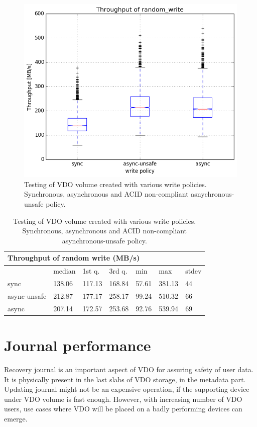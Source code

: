 \documentclass[
  color, %
  table, %
  lof,   %
  lot,   %
]{fithesis3}
\begin{document}
\begin{figure}[!htb]
        \centering
        \includegraphics[width=\textwidth]{../results/write_policies/report/random_write1_compare_boxplots}
\caption[Performance of various write policies]{Testing of VDO volume created with various write policies. Synchronous, asynchronous and ACID non-compliant asnychronous-unsafe policy.}
\label{fig:writepolicies}
\end{figure}

\begin{table}
\begin{tabular}{|l|l|l|l|l|l|l|}
        \hline
        \multicolumn{7}{|l|}{Throughput of random write (MB/s)} \\ \hline
         & median & 1st q. & 3rd q. & min & max & stdev \\ \hline 
sync & 138.06 & 117.13 & 168.84 & 57.61 & 381.13 & 44 \\ \hline
async-unsafe & 212.87 & 177.17 & 258.17 & 99.24 & 510.32 & 66 \\ \hline
async & 207.14 & 172.57 & 253.68 & 92.76 & 539.94 & 69 \\ \hline
\end{tabular}
\caption[Performance of various write policies]{Testing of VDO volume created with various write policies. Synchronous, asynchronous and ACID non-compliant asynchronous-unsafe policy.}
\label{tab:writepolicies}
\end{table}

\section{Journal performance}
Recovery journal is an important aspect of VDO for assuring safety of user data. It is physically present in the last slabs of VDO storage, in the metadata part. Updating journal might not be an expensive operation, if the supporting device under VDO volume is fast enough. However, with increasing number of VDO users, use cases where VDO will be placed on a badly performing devices can emerge.
\end{document}
